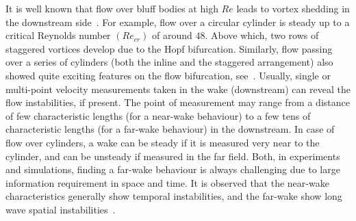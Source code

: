 \documentclass[aps,pre,twocolumn,aps,longbibliography]{revtex4-1}
\begin{document}
	It is well known that flow over bluff bodies at high $Re$ leads to vortex shedding in the downstream side~\cite{Sreenivasan1987}. For example, flow over a circular cylinder is steady up to a critical Reynolds number $(Re_{cr})$ of around $48$. Above which, two rows of staggered vortices develop due to the Hopf bifurcation. Similarly, flow passing over a series of cylinders (both the inline and the staggered arrangement) also showed quite exciting features on the flow bifurcation, see~\cite{Williamson1996, Shelley2011, LeeYou2013, Thompson2014}. Usually, single or multi-point velocity measurements taken in the wake (downstream) can reveal the flow instabilities, if present. The point of measurement may range from a distance of few characteristic lengths (for a near-wake behaviour) to a few tens of characteristic lengths (for a far-wake behaviour) in the downstream. In case of flow over cylinders, a wake can be steady if it is measured very near to the cylinder, and can be unsteady if measured in the far field. Both, in experiments and simulations, finding a far-wake behaviour is always challenging due to large information requirement in space and time. It is observed that the near-wake characteristics generally show temporal instabilities, and the far-wake show long wave spatial instabilities~\cite{Saha2003}.
	
\end{document}
